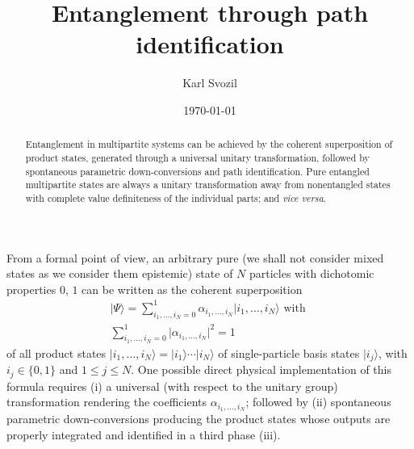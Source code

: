 \documentclass[%
  twocolumn,
 showpacs,
 showkeys,
 preprintnumbers,
 amsmath,amssymb,
 aps,
  pra,
  longbibliography,
 floatfix,
 ]{revtex4-1}
\begin{document}
\title{Entanglement through path identification}


\author{Karl Svozil}



\date{\today}

\begin{abstract}
Entanglement in multipartite systems can be achieved by the coherent superposition of product states, generated through a universal unitary transformation, followed by spontaneous parametric down-conversions and path identification. Pure entangled multipartite states are always a unitary transformation away from nonentangled states with complete value definiteness of the individual parts; and {\it vice versa}.
\end{abstract}


\maketitle


From a formal point of view, an arbitrary pure (we shall not consider mixed states as we consider them epistemic)
state of $N$ particles with dichotomic properties $0$, $1$
can be written as the coherent superposition
\begin{equation}
\begin{split}
 \vert   \Psi   \rangle
=
\sum_{i_1,\ldots , i_N=0}^{1}
\alpha_{i_1,\ldots , i_N}
\vert   i_1,\ldots , i_N    \rangle
\text{ with } \\
\sum_{i_1,\ldots , i_N=0}^{1}
\vert \alpha_{i_1,\ldots , i_N} \vert^2 =   1
\end{split}
\label{2017-etpi-e1}
\end{equation}
of all product states
$\vert   i_1,\ldots , i_N    \rangle
=
\vert    i_1 \rangle  \cdots  \vert   i_N    \rangle
$ of   single-particle basis states $\vert i_j \rangle $, with $i_j \in \{0,1\}$ and
 $1 \le j \le N$.
One possible direct physical implementation of this formula
requires
(i) a universal (with respect to the unitary group) transformation rendering the coefficients
$\alpha_{i_1,\ldots , i_N}$;
followed by
(ii)   spontaneous parametric down-conversions producing the product states
whose outputs are properly integrated and identified in a third phase (iii).
\end{document}
